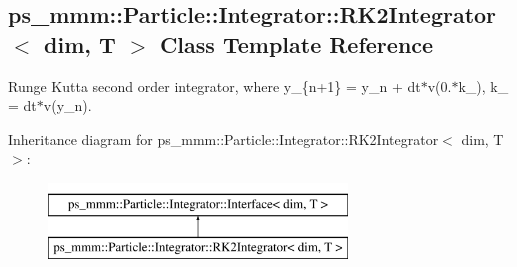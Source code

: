 \hypertarget{classps__mmm_1_1_particle_1_1_integrator_1_1_r_k2_integrator}{}\subsection{ps\+\_\+mmm\+:\+:Particle\+:\+:Integrator\+:\+:R\+K2\+Integrator$<$ dim, T $>$ Class Template Reference}
\label{classps__mmm_1_1_particle_1_1_integrator_1_1_r_k2_integrator}


Runge Kutta second order integrator, where y\+\_\+\{n+1\} = y\+\_\+n + dt$\ast$v(0.$\ast$k\+\_), k\+\_ = dt$\ast$v(y\+\_\+n).  


Inheritance diagram for ps\+\_\+mmm\+:\+:Particle\+:\+:Integrator\+:\+:R\+K2\+Integrator$<$ dim, T $>$\+:\begin{figure}[H]
\begin{center}
\leavevmode
\includegraphics[height=2.000000cm]{classps__mmm_1_1_particle_1_1_integrator_1_1_r_k2_integrator}
\end{center}
\end{figure}
